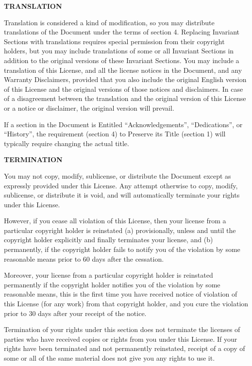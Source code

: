 \item
{\bf TRANSLATION}

Translation is considered a kind of modification, so you may distribute translations of the Document under the terms of section 4. Replacing Invariant Sections with translations requires special permission from their copyright holders, but you may include translations of some or all Invariant Sections in addition to the original versions of these Invariant Sections.  You may include a translation of this License, and all the license notices in the Document, and any Warranty Disclaimers, provided that you also include the original English version of this License and the original versions of those notices and disclaimers.  In case of a disagreement between the translation and the original version of this License or a notice or disclaimer, the original version will prevail.

If a section in the Document is Entitled ``Acknowledgements'', ``Dedications'', or ``History'', the requirement (section 4) to Preserve its Title (section 1) will typically require changing the actual title.

\item
{\bf TERMINATION}

You may not copy, modify, sublicense, or distribute the Document except as expressly provided under this License.  Any attempt otherwise to copy, modify, sublicense, or distribute it is void, and will automatically terminate your rights under this License.

However, if you cease all violation of this License, then your license from a particular copyright holder is reinstated (a) provisionally, unless and until the copyright holder explicitly and finally terminates your license, and (b) permanently, if the copyright holder fails to notify you of the violation by some reasonable means prior to 60 days after the cessation.

Moreover, your license from a particular copyright holder is reinstated permanently if the copyright holder notifies you of the violation by some reasonable means, this is the first time you have received notice of violation of this License (for any work) from that copyright holder, and you cure the violation prior to 30 days after your receipt of the notice.

Termination of your rights under this section does not terminate the licenses of parties who have received copies or rights from you under this License.  If your rights have been terminated and not permanently reinstated, receipt of a copy of some or all of the same material does not give you any rights to use it.

